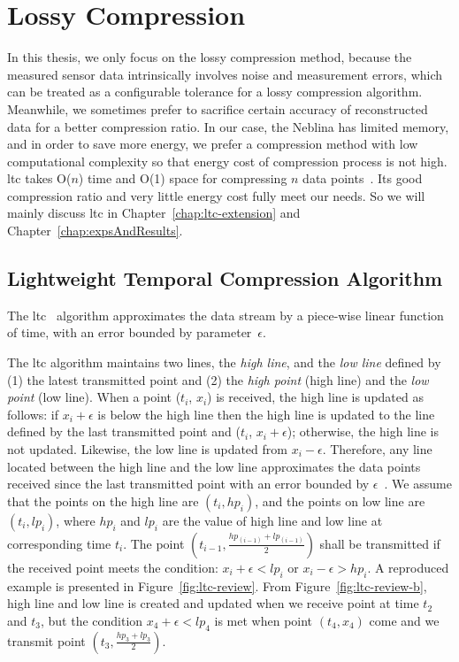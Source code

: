 \section{Lossy Compression}
\label{sec:lossy}

In this thesis, we only focus on the lossy compression method, because the
measured sensor data intrinsically involves noise and measurement errors, which
can be treated as a configurable tolerance for a lossy compression algorithm.
Meanwhile, we sometimes prefer to sacrifice certain accuracy of reconstructed
data for a better compression ratio. In our case, the Neblina has limited
memory, and in order to save more energy, we prefer a compression method with
low computational complexity so that energy cost of compression process is not
high. \acrshort{ltc} takes O($n$) time and O(1) space for compressing $n$ data
points~\cite{schoellhammer2004lightweight}. Its good compression ratio and very
little energy cost fully meet our needs. So we will mainly discuss
\acrshort{ltc} in Chapter~\ref{chap:ltc-extension} and
Chapter~\ref{chap:expsAndResults}.

\subsection{Lightweight Temporal Compression Algorithm}
\label{sec:ltc}

The \acrfull{ltc}~\cite{schoellhammer2004lightweight}
algorithm approximates the data stream by a piece-wise linear function of time,
with an error bounded by parameter~$\epsilon$.

The \acrshort{ltc} algorithm maintains two lines, the \emph{high line}, and the
\emph{low line} defined by (1) the latest transmitted point and (2) the
\emph{high point} (high line) and the \emph{low point} (low line). When a point
($t_i$, $x_i$) is received, the high line is updated as follows: if
$x_i+\epsilon$ is below the high line then the high line is updated to the line
defined by the last transmitted point and ($t_i$, $x_i+\epsilon$); otherwise,
the high line is not updated. Likewise, the low line is updated from
$x_i-\epsilon$. Therefore, any line located between the high line and the low
line approximates the data points received since the last transmitted point with
an error bounded by $\epsilon$~\cite{schoellhammer2004lightweight}. We assume
that the points on the high line are $(t_i, hp_i)$, and the points on low line
are $(t_i, lp_i)$, where $hp_i$ and $lp_i$ are the value of high line and low
line at corresponding time $t_i$.
The point $(t_{i-1}, \frac{hp_{(i-1)}+lp_{(i-1)}}{2})$ shall be transmitted if
the received point meets the condition:
$x_i+\epsilon < lp_{i}$ or $x_i-\epsilon > hp_{i}$. A reproduced example is
presented in Figure~\ref{fig:ltc-review}. From Figure~\ref{fig:ltc-review-b},
high line and low line is created and updated when we receive point at time
$t_2$ and $t_3$, but the condition $x_4+\epsilon < lp_{4}$ is met when point
$(t_4, x_4)$ come and we transmit point $(t_3, \frac{hp_{3}+lp_{3}}{2})$.

